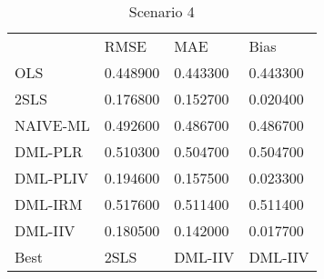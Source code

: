 \begin{table}[H]
\caption{Scenario 4}
\label{Scenario4}
\begin{tabular}{L{3.3333333333333335cm}L{2.6666666666666665cm}R{2.0cm}R{2.6666666666666665cm}}
 & RMSE & MAE & Bias \\
OLS & 0.448900 & 0.443300 & 0.443300 \\
2SLS & 0.176800 & 0.152700 & 0.020400 \\
NAIVE-ML & 0.492600 & 0.486700 & 0.486700 \\
DML-PLR & 0.510300 & 0.504700 & 0.504700 \\
DML-PLIV & 0.194600 & 0.157500 & 0.023300 \\
DML-IRM & 0.517600 & 0.511400 & 0.511400 \\
DML-IIV & 0.180500 & 0.142000 & 0.017700 \\
Best & 2SLS & DML-IIV & DML-IIV \\
\end{tabular}
\end{table}
